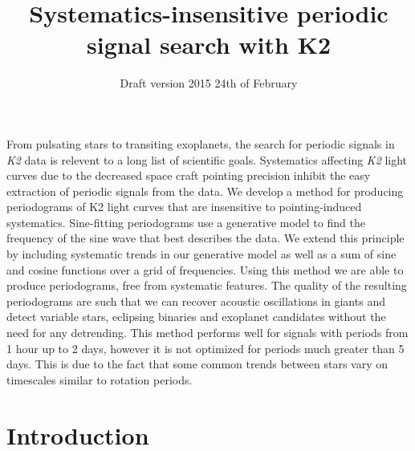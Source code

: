 \documentclass[useAMS, usenatbib]{aastex}
\title{Systematics-insensitive periodic signal search with K2}
\begin{document}
\date{Draft version 2015 24th of February}
\maketitle

From pulsating stars to transiting exoplanets, the search for periodic signals
in {\it K2} data is relevent to a long list of scientific goals.
Systematics affecting {\it K2} light curves due to the decreased
space craft pointing precision inhibit the easy extraction of periodic signals
from the data.
We develop a method for producing periodograms of K2 light curves that
are insensitive to pointing-induced systematics.
Sine-fitting periodograms use a generative model to find the frequency
of the sine wave that best describes the data.
We extend this principle by including systematic trends in our generative
model as well as a sum of sine and cosine functions over a grid of
frequencies.
Using this method we are able to produce periodograms, free from
systematic features.
The quality of the resulting periodograms are such that we can recover
acoustic oscillations in giants and detect variable stars, eclipsing binaries
and exoplanet candidates without the need for any detrending.
This method performs well for signals with periods from 1 hour up to 2 days,
however it is not optimized for periods much greater than 5 days.
This is due to the fact that some common trends between stars vary on
timescales similar to rotation periods.

\section{Introduction}
\label{Introduction}
\end{document}
